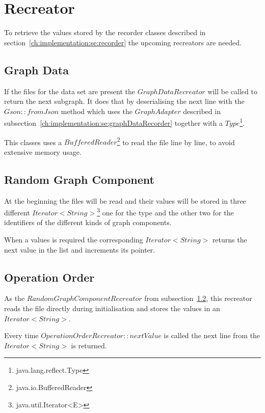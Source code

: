 \section{Recreator}
\label{ch:implementation:se:recreator}
To retrieve the values stored by the recorder classes described in section~\ref{ch:implementation:se:recorder} the upcoming recreators are needed.

\subsection{Graph Data}
If the files for the data set are present the $ GraphDataRecreator $ will be called to return the next subgraph.
It does that by deserialising the next line with the $ Gson::fromJson $ method which uses the $ GraphAdapter $ described in subsection~\ref{ch:implementation:se:graphDataRecorder} together with a $ Type $\footnote{java.lang.reflect.Type}.

This classes uses a $ BufferedReader $\footnote{java.io.BufferedReader} to read the file line by line,
to avoid extensive memory usage.

\subsection{Random Graph Component}
\label{ch:implementation:se:randomGraphComponentRecreator}
At the beginning the files will be read and their values will be stored in three different $ Iterator<String> $\footnote{java.util.Iterator<E>} one for the type and the other two for the identifiers of the different kinds of graph components.

When a values is required the corresponding $ Iterator<String> $ returns the next value in the list and increments its pointer.

\subsection{Operation Order}
As the $ RandomGraphComponentRecreator $ from subsection~\ref{ch:implementation:se:randomGraphComponentRecreator},
this recreator reads the file directly during initialisation and stores the values in an $ Iterator<String> $.

Every time $ OperationOrderRecreator::nextValue $ is called the next line from the $ Iterator<String> $ is returned.

